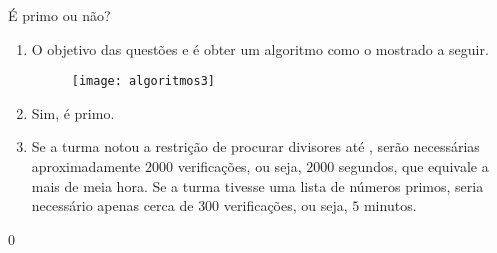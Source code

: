 \begin{answer}{É primo ou não?}
{
\begin{enumerate}
\item O objetivo das questões  e  é obter um algoritmo como o mostrado a seguir.

\begin{figure}[H]
\centering

\texttt{[image: algoritmos3]}
\end{figure}

\item Sim, é primo.

\item Se a turma notou a restrição de procurar divisores até , serão necessárias aproximadamente $2000$ verificações, ou seja, $2000$ segundos, que equivale a mais de meia hora. Se a turma tivesse uma lista de números primos, seria necessário apenas cerca de $300$ verificações, ou seja, $5$ minutos.
\end{enumerate}
}{0}
\end{answer}
\clearmargin

